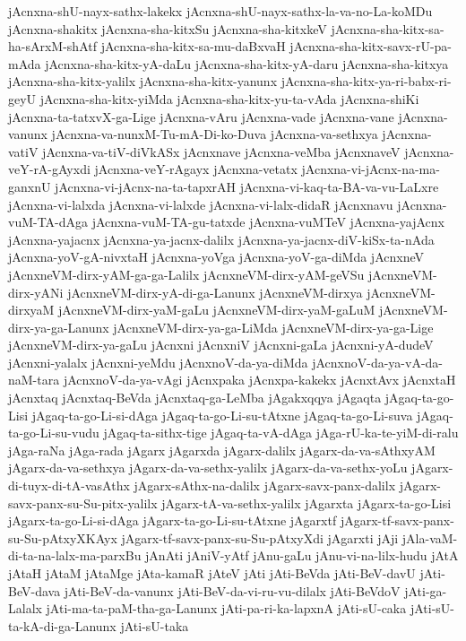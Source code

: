 {jAcnxna-shU-nayx-sathx-lakekx
jAcnxna-shU-nayx-sathx-la-va-no-La-koMDu
jAcnxna-shakitx
jAcnxna-sha-kitxSu
jAcnxna-sha-kitxkeV
jAcnxna-sha-kitx-sa-ha-sArxM-shAtf
jAcnxna-sha-kitx-sa-mu-daBxvaH
jAcnxna-sha-kitx-savx-rU-pa-mAda
jAcnxna-sha-kitx-yA-daLu
jAcnxna-sha-kitx-yA-daru
jAcnxna-sha-kitxya
jAcnxna-sha-kitx-yalilx
jAcnxna-sha-kitx-yanunx
jAcnxna-sha-kitx-ya-ri-babx-ri-geyU
jAcnxna-sha-kitx-yiMda
jAcnxna-sha-kitx-yu-ta-vAda
jAcnxna-shiKi
jAcnxna-ta-tatxvX-ga-Lige
jAcnxna-vAru
jAcnxna-vade
jAcnxna-vane
jAcnxna-vanunx
jAcnxna-va-nunxM-Tu-mA-Di-ko-Duva
jAcnxna-va-sethxya
jAcnxna-vatiV
jAcnxna-va-tiV-diVkASx
jAcnxnave
jAcnxna-veMba
jAcnxnaveV
jAcnxna-veY-rA-gAyxdi
jAcnxna-veY-rAgayx
jAcnxna-vetatx
jAcnxna-vi-jAcnx-na-ma-ganxnU
jAcnxna-vi-jAcnx-na-ta-tapxrAH
jAcnxna-vi-kaq-ta-BA-va-vu-LaLxre
jAcnxna-vi-lalxda
jAcnxna-vi-lalxde
jAcnxna-vi-lalx-didaR
jAcnxnavu
jAcnxna-vuM-TA-dAga
jAcnxna-vuM-TA-gu-tatxde
jAcnxna-vuMTeV
jAcnxna-yajAcnx
jAcnxna-yajacnx
jAcnxna-ya-jacnx-dalilx
jAcnxna-ya-jacnx-diV-kiSx-ta-nAda
jAcnxna-yoV-gA-nivxtaH
jAcnxna-yoVga
jAcnxna-yoV-ga-diMda
jAcnxneV
jAcnxneVM-dirx-yAM-ga-ga-Lalilx
jAcnxneVM-dirx-yAM-geVSu
jAcnxneVM-dirx-yANi
jAcnxneVM-dirx-yA-di-ga-Lanunx
jAcnxneVM-dirxya
jAcnxneVM-dirxyaM
jAcnxneVM-dirx-yaM-gaLu
jAcnxneVM-dirx-yaM-gaLuM
jAcnxneVM-dirx-ya-ga-Lanunx
jAcnxneVM-dirx-ya-ga-LiMda
jAcnxneVM-dirx-ya-ga-Lige
jAcnxneVM-dirx-ya-gaLu
jAcnxni
jAcnxniV
jAcnxni-gaLa
jAcnxni-yA-dudeV
jAcnxni-yalalx
jAcnxni-yeMdu
jAcnxnoV-da-ya-diMda
jAcnxnoV-da-ya-vA-da-naM-tara
jAcnxnoV-da-ya-vAgi
jAcnxpaka
jAcnxpa-kakekx
jAcnxtAvx
jAcnxtaH
jAcnxtaq
jAcnxtaq-BeVda
jAcnxtaq-ga-LeMba
jAgakxqqya
jAgaqta
jAgaq-ta-go-Lisi
jAgaq-ta-go-Li-si-dAga
jAgaq-ta-go-Li-su-tAtxne
jAgaq-ta-go-Li-suva
jAgaq-ta-go-Li-su-vudu
jAgaq-ta-sithx-tige
jAgaq-ta-vA-dAga
jAga-rU-ka-te-yiM-di-ralu
jAga-raNa
jAga-rada
jAgarx
jAgarxda
jAgarx-dalilx
jAgarx-da-va-sAthxyAM
jAgarx-da-va-sethxya
jAgarx-da-va-sethx-yalilx
jAgarx-da-va-sethx-yoLu
jAgarx-di-tuyx-di-tA-vasAthx
jAgarx-sAthx-na-dalilx
jAgarx-savx-panx-dalilx
jAgarx-savx-panx-su-Su-pitx-yalilx
jAgarx-tA-va-sethx-yalilx
jAgarxta
jAgarx-ta-go-Lisi
jAgarx-ta-go-Li-si-dAga
jAgarx-ta-go-Li-su-tAtxne
jAgarxtf
jAgarx-tf-savx-panx-su-Su-pAtxyXKAyx
jAgarx-tf-savx-panx-su-Su-pAtxyXdi
jAgarxti
jAji
jAla-vaM-di-ta-na-lalx-ma-parxBu
jAnAti
jAniV-yAtf
jAnu-gaLu
jAnu-vi-na-lilx-hudu
jAtA
jAtaH
jAtaM
jAtaMge
jAta-kamaR
jAteV
jAti
jAti-BeVda
jAti-BeV-davU
jAti-BeV-dava
jAti-BeV-da-vanunx
jAti-BeV-da-vi-ru-vu-dilalx
jAti-BeVdoV
jAti-ga-Lalalx
jAti-ma-ta-paM-tha-ga-Lanunx
jAti-pa-ri-ka-lapxnA
jAti-sU-caka
jAti-sU-ta-kA-di-ga-Lanunx
jAti-sU-taka
}
